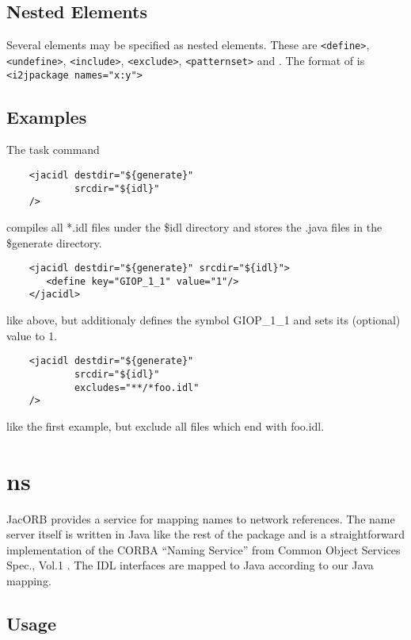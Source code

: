 \subsection*{Nested Elements}

Several elements may be specified as nested elements. These are {\tt <define>}, {\tt <undefine>}, {\tt <include>}, {\tt <exclude>}, {\tt <patternset>} and {\tt <i2jpackage>}. The format of {\tt <i2jpackage>} is {\tt <i2jpackage names="x:y">}


\subsection*{Examples}

The task command
\small{\begin{verbatim}
    <jacidl destdir="${generate}"
            srcdir="${idl}"
    />
\end{verbatim}
}

compiles all *.idl files under the \${idl} directory and stores the .java files in the \${generate} directory.

\small{\begin{verbatim}
    <jacidl destdir="${generate}" srcdir="${idl}">
       <define key="GIOP_1_1" value="1"/>
    </jacidl>
\end{verbatim}
}

like above, but additionaly defines the symbol GIOP\_1\_1 and sets its (optional) value to 1.

\small{\begin{verbatim}
    <jacidl destdir="${generate}"
            srcdir="${idl}"
            excludes="**/*foo.idl"
    />
\end{verbatim}
}

like the first example, but exclude all files which end with foo.idl.

\section{ns}

JacORB provides a service for mapping names to network references. The
name server itself is written in Java like the rest of the package and
is a  straightforward implementation  of the CORBA  ``Naming Service''
from  Common  Object Services  Spec.,  Vol.1  \cite{OMG1997}. The  IDL
interfaces are mapped to Java according to our Java mapping.

\subsection*{Usage}


